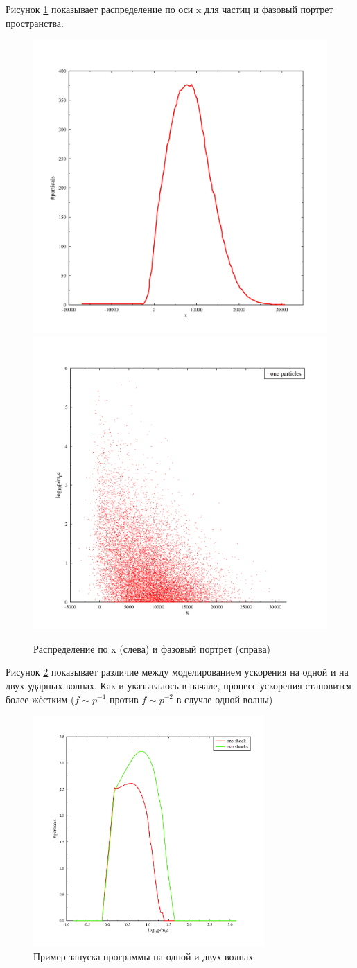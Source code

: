 \documentclass[a4paper,14pt]{extarticle} %
\begin{document}
Рисунок \ref{res/stoh/x} показывает распределение по оси x для частиц и фазовый портрет пространства.
\begin{figure}[H]
\centering
\includegraphics[width=0.3\linewidth]{stoh_x}
\includegraphics[width=0.3\linewidth]{stoh_px}

\caption{Распределение по x (слева) и фазовый портрет (справа)}
\label{res/stoh/x}
\end{figure}

Рисунок \ref{res/stoh/two} показывает различие между моделированием ускорения на одной и на двух ударных волнах. Как и указывалось в начале, процесс ускорения становится более жёстким ($f\sim p^{-1}$ против $f\sim p^{-2}$ в случае одной волны)
\begin{figure}[H]
\centering
\includegraphics[width=250pt]{stoh_two_or_one}
\caption{Пример запуска программы на одной и двух волнах}
\label{res/stoh/two}
\end{figure}
\end{document}
